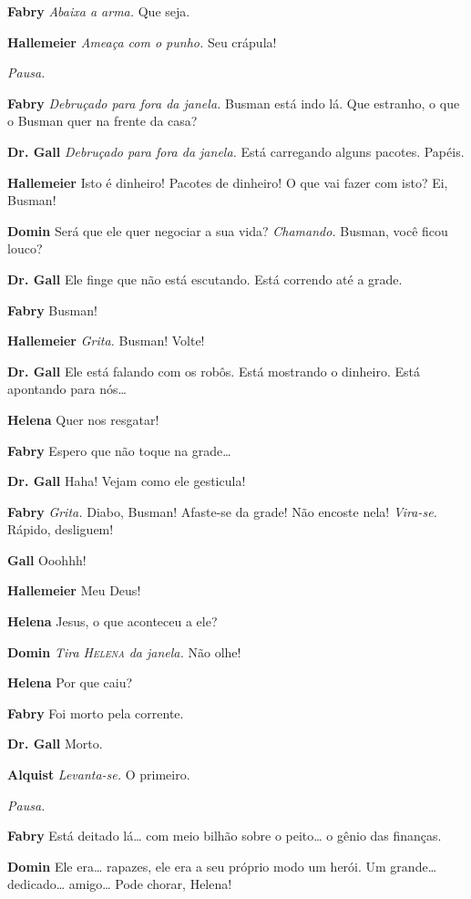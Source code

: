 \textbf{Fabry} \emph{Abaixa a arma.} Que seja.

\textbf{Hallemeier} \emph{Ameaça com o punho.} Seu crápula!

\emph{Pausa.}

\textbf{Fabry} \emph{Debruçado para fora da janela.} Busman está indo lá. Que estranho,
o que o Busman quer na frente da casa?

\textbf{Dr. Gall} \emph{Debruçado para fora da janela.} Está carregando alguns
pacotes. Papéis.

\textbf{Hallemeier} Isto é dinheiro! Pacotes de dinheiro! O que vai fazer com isto? Ei,
Busman!

\textbf{Domin} Será que ele quer negociar a sua vida? \emph{Chamando.} Busman, você
ficou louco?

\textbf{Dr. Gall} Ele finge que não está escutando. Está correndo até a grade.

\textbf{Fabry} Busman!

\textbf{Hallemeier} \emph{Grita.} Busman! Volte!

\textbf{Dr. Gall} Ele está falando com os robôs. Está mostrando o dinheiro. Está
apontando para nós\ldots{}

\textbf{Helena} Quer nos resgatar!

\textbf{Fabry} Espero que não toque na grade\ldots{}

\textbf{Dr. Gall} Haha! Vejam como ele gesticula!

\textbf{Fabry} \emph{Grita.} Diabo, Busman! Afaste-se da grade! Não encoste nela!
\emph{Vira-se.} Rápido, desliguem!

\textbf{Gall} Ooohhh!

\textbf{Hallemeier} Meu Deus!

\textbf{Helena} Jesus, o que aconteceu a ele?

\textbf{Domin} \emph{Tira \textsc{Helena} da janela.} Não olhe!

\textbf{Helena} Por que caiu?

\textbf{Fabry} Foi morto pela corrente.

\textbf{Dr. Gall} Morto.

\textbf{Alquist} \emph{Levanta-se.} O primeiro.

\emph{Pausa.}

\textbf{Fabry} Está deitado lá\ldots{} com meio bilhão sobre o peito\ldots{} o gênio das
finanças.

\textbf{Domin} Ele era\ldots{} rapazes, ele era a seu próprio modo um herói. Um
grande\ldots{} dedicado\ldots{} amigo\ldots{} Pode chorar, Helena!

